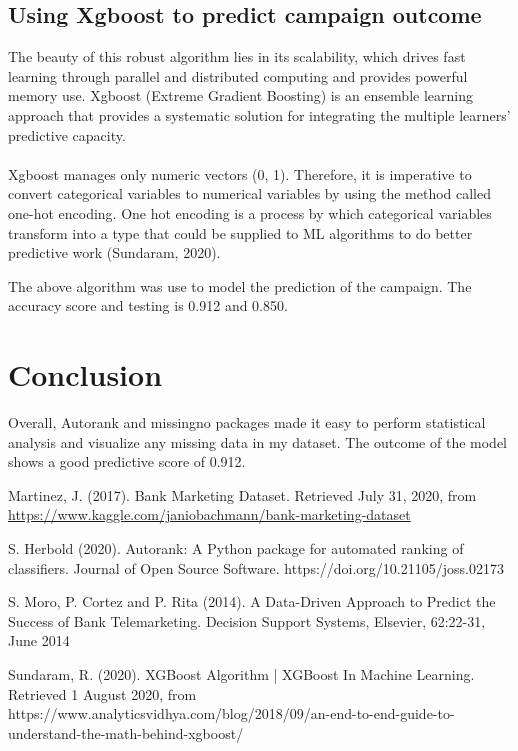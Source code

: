 \documentclass[12pt]{article}
\begin{document}
\subsection{Using Xgboost to predict campaign outcome}
The beauty of this robust algorithm lies in its scalability, which drives fast learning
through parallel and distributed computing and provides powerful memory use. Xgboost (Extreme Gradient Boosting) is an ensemble learning approach that provides a systematic solution for integrating the multiple learners' predictive capacity.\\\\
Xgboost manages only numeric vectors (0, 1). Therefore, it is imperative to convert
categorical variables to numerical variables by using the method called one-hot encoding. One hot encoding is a process by which categorical variables transform into a type that could be supplied to ML algorithms to do better predictive work (Sundaram, 2020).

The above algorithm was use to model the prediction of the campaign. The accuracy score and testing is 0.912 and 0.850. 

\section{Conclusion}
Overall, Autorank and missingno packages made it easy to perform statistical analysis and visualize any missing data in my dataset. The outcome of the model shows a good predictive score of 0.912. 
\newpage

\begin{thebibliography}{999}

	Martinez, J. (2017). Bank Marketing Dataset. Retrieved July 31, 2020, from {\url{https://www.kaggle.com/janiobachmann/bank-marketing-dataset}}

   
	S. Herbold (2020). Autorank: A Python package for automated ranking of classifiers. Journal of Open Source Software. https://doi.org/10.21105/joss.02173
	
S. Moro, P. Cortez and P. Rita (2014). A Data-Driven Approach to Predict the Success of Bank Telemarketing. Decision Support Systems, Elsevier, 62:22-31, June 2014

Sundaram, R. (2020). XGBoost Algorithm | XGBoost In Machine Learning. Retrieved 1 August 2020, from https://www.analyticsvidhya.com/blog/2018/09/an-end-to-end-guide-to-understand-the-math-behind-xgboost/


\end{thebibliography}
\end{document}
